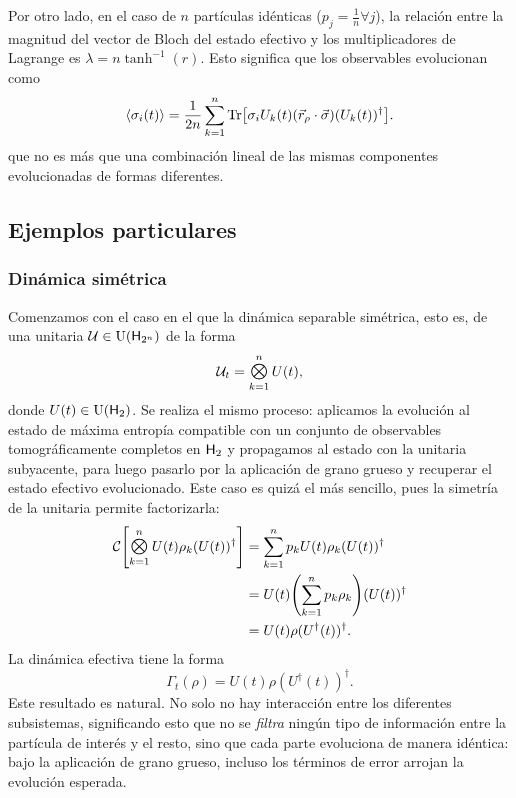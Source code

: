 Por otro lado, en el caso de $n$ partículas idénticas  ($p_{j}=\frac{1}{n}\forall j$), la relación entre la magnitud del vector de Bloch del estado efectivo y los multiplicadores de Lagrange es $\lambda=n\tanh^{-1}(r)$. Esto significa que los observables evolucionan como
\begin{equation*}
    \expval{\sigma_{i}(t)}=\frac{1}{2n}\sum_{k=1}^{n}\Tr[\sigma_{i}U_{k}(t) (\vec{r}_{\rho}\cdot\vec{\sigma}) (U_{k}(t))^{\dag}].
\end{equation*}
que no es más que una combinación lineal de las mismas componentes evolucionadas de formas diferentes.
\subsection{Ejemplos particulares}

\subsubsection{Dinámica simétrica}

Comenzamos con el caso en el que la dinámica separable simétrica, esto es, de una unitaria $\mathcal{U}\in\text{U}({\sf H}_{2^{n}})$ de la forma
\begin{equation*}
    \mcU_{t}=\Motimes_{k=1}^{n}U(t),
\end{equation*}
donde $U(t)\in\text{U}({\sf H}_{2})$. Se realiza el mismo proceso: aplicamos la evolución al estado de máxima entropía compatible con un conjunto de observables tomográficamente completos en ${\sf H}_{2}$ y propagamos al estado con la unitaria subyacente, para luego pasarlo por la aplicación de grano grueso y recuperar el estado efectivo evolucionado. Este caso es quizá el más sencillo, pues la simetría de la unitaria permite factorizarla:
\begin{align*}
\mcC\qty[\Motimes_{k=1}^{n}U(t) \rho_{k} (U(t))^{\dag}]&=\sum_{k=1}^{n}p_{k} U(t) \rho_{k} (U(t))^{\dag} \\
&=U(t)\qty(\sum_{k=1}^{n}p_{k} \rho_{k}) (U(t))^{\dag}\\
&=U(t)\rho(U^{\dag}(t))^{\dag}.
\end{align*}
La dinámica efectiva tiene la forma
\begin{equation*}
    \Gamma_{t}(\rho)=U(t)\rho(U^{\dag}(t))^{\dag}.
\end{equation*}
Este resultado es natural. No solo no hay interacción entre los diferentes subsistemas, significando esto que no se \textit{filtra} ningún tipo de información entre la partícula de interés y el resto, sino que cada parte evoluciona de manera idéntica: bajo la aplicación de grano grueso, incluso los términos de error arrojan la evolución esperada.

